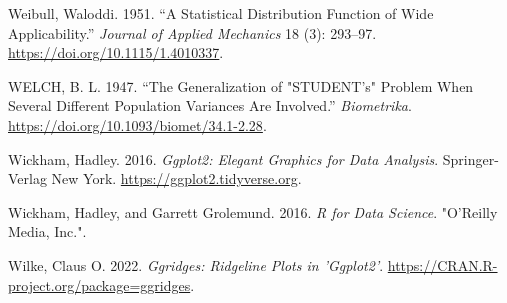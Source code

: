 \documentclass[
  a4paper,
]{scrbook}
\newlength{\cslhangindent}
\newenvironment{CSLReferences}[2] %
 {\begin{list}{}{%
  \setlength{\itemindent}{0pt}
  \setlength{\leftmargin}{0pt}
  \setlength{\parsep}{0pt}
  \ifodd #1
   \setlength{\leftmargin}{\cslhangindent}
   \setlength{\itemindent}{-1\cslhangindent}
  \fi
  \setlength{\itemsep}{#2\baselineskip}}}
 {\end{list}}
\begin{document}
\begin{CSLReferences}{1}{0}
Weibull, Waloddi. 1951. {``A Statistical Distribution Function of Wide
Applicability.''} \emph{Journal of Applied Mechanics} 18 (3): 293--97.
\url{https://doi.org/10.1115/1.4010337}.

WELCH, B. L. 1947. {``The Generalization of "STUDENT's" Problem When
Several Different Population Variances Are Involved.''}
\emph{Biometrika}. \url{https://doi.org/10.1093/biomet/34.1-2.28}.

Wickham, Hadley. 2016. \emph{Ggplot2: Elegant Graphics for Data
Analysis}. Springer-Verlag New York.
\url{https://ggplot2.tidyverse.org}.

Wickham, Hadley, and Garrett Grolemund. 2016. \emph{R for Data Science}.
"O'Reilly Media, Inc.".

Wilke, Claus O. 2022. \emph{Ggridges: Ridgeline Plots in 'Ggplot2'}.
\url{https://CRAN.R-project.org/package=ggridges}.

\end{CSLReferences}


\backmatter
\end{document}

